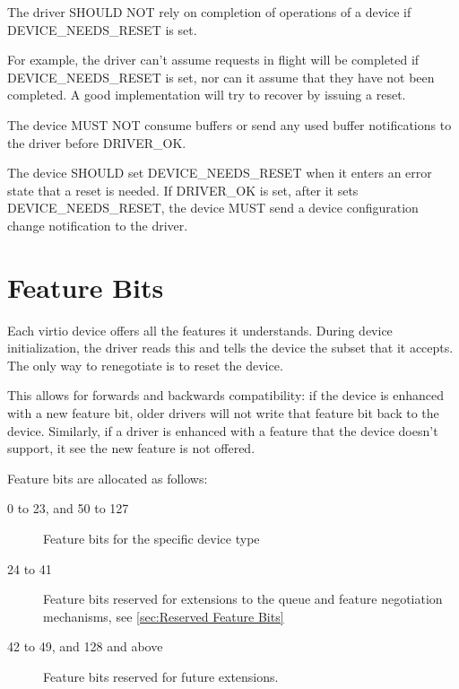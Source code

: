 The driver SHOULD NOT rely on completion of operations of a
device if DEVICE_NEEDS_RESET is set.
\begin{note}
For example, the driver can't assume requests in flight will be
completed if DEVICE_NEEDS_RESET is set, nor can it assume that
they have not been completed.  A good implementation will try to
recover by issuing a reset.
\end{note}


The device MUST NOT consume buffers or send any used buffer
notifications to the driver before DRIVER_OK.

\label{sec:Basic Facilities of a Virtio Device / Device Status Field / DEVICENEEDSRESET}The device SHOULD set DEVICE_NEEDS_RESET when it enters an error state
that a reset is needed.  If DRIVER_OK is set, after it sets DEVICE_NEEDS_RESET, the device
MUST send a device configuration change notification to the driver.

\section{Feature Bits}\label{sec:Basic Facilities of a Virtio Device / Feature Bits}

Each virtio device offers all the features it understands.  During
device initialization, the driver reads this and tells the device the
subset that it accepts.  The only way to renegotiate is to reset
the device.

This allows for forwards and backwards compatibility: if the device is
enhanced with a new feature bit, older drivers will not write that
feature bit back to the device.  Similarly, if a driver is enhanced with a feature
that the device doesn't support, it see the new feature is not offered.

Feature bits are allocated as follows:

\begin{description}
\item[0 to 23, and 50 to 127] Feature bits for the specific device type

\item[24 to 41] Feature bits reserved for extensions to the queue and
  feature negotiation mechanisms, see \ref{sec:Reserved Feature Bits}

\item[42 to 49, and 128 and above] Feature bits reserved for future extensions.
\end{description}

